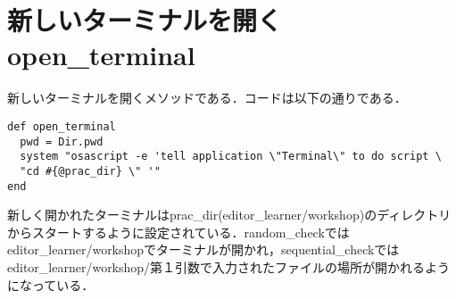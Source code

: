     \section{新しいターミナルを開くopen\_terminal}\label{ux65b0ux3057ux3044ux30bfux30fcux30dfux30caux30ebux3092ux958bux304fopen_terminal}

新しいターミナルを開くメソッドである．コードは以下の通りである．
\begin{screen}
{\small
\begin{verbatim}
def open_terminal
  pwd = Dir.pwd
  system "osascript -e 'tell application \"Terminal\" to do script \
  "cd #{@prac_dir} \" '"
end
\end{verbatim}}
\end{screen}

新しく開かれたターミナルはprac\_dir(editor\_learner/workshop)のディレクトリからスタートするように設定されている．random\_checkではeditor\_learner/workshopでターミナルが開かれ，sequential\_checkではeditor\_learner/workshop/第１引数で入力されたファイルの場所が開かれるようになっている．

    